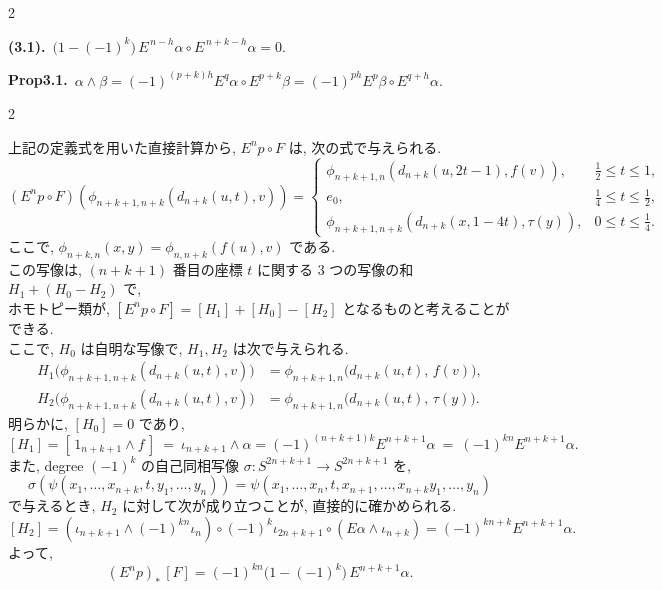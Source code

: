 \documentclass[10pt, leqno]{ltjsarticle}
\newcommand{\Ex}{E}        %
\numberwithin{equation}{section}
\theoremstyle{plain}
\theoremstyle{definition}
\theoremstyle{remark}
\begin{document}
\begin{paracol}{2}
\switchcolumn

\noindent
\textbf{(3.1).}\
\(\bigl(1-(-1)^k\bigr)\, \Ex^{\,n-h}\alpha \circ \Ex^{\,n+k-h}\alpha = 0.\)

\noindent
\textbf{Prop3.1.}\
\(
\alpha \wedge \beta
= (-1)^{(p+k)h} E^{q}\alpha \circ E^{p+k}\beta
= (-1)^{ph} E^{p}\beta \circ E^{q+h}\alpha .
\)


\end{paracol}

\begin{paracol}{2}

\noindent
上記の定義式を用いた直接計算から, 
\(E^n p\circ F\) は, 次の式で与えられる. 
\[
(E^n p\circ F)(\phi_{n+k+1, n+k}(d_{n+k}(u, t), v))=
\begin{cases}
\phi_{n+k+1, n}(d_{n+k}(u, 2t-1), f(v)), & \frac{1}{2}\le t\le1,\\[3pt]
e_0, & \frac{1}{4}\le t\le \frac{1}{2},\\[3pt]
\phi_{n+k+1, n+k}(d_{n+k}(x, 1-4t), \tau(y)), & 0\le t\le \frac{1}{4}.
\end{cases}
\]
ここで, 
\(\phi_{n+k, n}(x, y) = \phi_{n, n+k}(f(u), v)\) である. \\
この写像は, \((n+k+1)\) 番目の座標 $t$ に関する 3 つの写像の和
\(H_1 + (H_0 - H_2)\) で, \\
ホモトピー類が,
\([E^n p\circ F] = [H_1] + [H_0] - [H_2]\) 
となるものと考えることができる. \\
ここで, \(H_0\) は自明な写像で, $H_1,H_2$ は次で与えられる. 
\[
\begin{aligned}
H_1\bigl(\phi_{n+k+1,n+k}(d_{n+k}(u,t),v)\bigr)
&=\phi_{n+k+1,n}\bigl(d_{n+k}(u,t),\,f(v)\bigr),\\
H_2\bigl(\phi_{n+k+1,n+k}(d_{n+k}(u,t),v)\bigr)
&=\phi_{n+k+1,n}\bigl(d_{n+k}(u,t),\,\tau(y)\bigr).
\end{aligned}
\]
明らかに, $[H_0]=0$ であり, 
\[
[H_1] = [\,1_{n+k+1} \wedge f\,]\ 
=\ \iota_{n+k+1} \wedge \alpha
 = (-1)^{(n+k+1)k}\Ex^{n+k+1}\alpha\
=\ (-1)^{kn}E^{n+k+1}\alpha .
\]
また, degree \((-1)^k\) の自己同相写像 
\(\sigma:S^{2n+k+1}\to S^{2n+k+1}\) を, \\
\[
\sigma(\psi(x_1,\ldots,x_{n+k}, t, y_1,\ldots,y_n))
= \psi(x_1,\ldots, x_n, t, x_{n+1},\ldots,x_{n+k} y_1,\ldots,y_n)
\]
で与えるとき, $H_2$ に対して次が成り立つことが, 直接的に確かめられる.
\[
[H_2] = (\iota_{n+k+1} \wedge (-1)^{kn} \iota_n) \circ (-1)^{k}\iota_{2n+k+1}
\circ (E\alpha \wedge \iota_{n+k})
 = (-1)^{kn+k}E^{n+k+1}\alpha .
\]
よって, 
\[
(\Ex^{n}p)_*\,[F] = (-1)^{kn}\bigl(1-(-1)^k\bigr)\,\Ex^{n+k+1}\alpha .
\]
\end{paracol}
\end{document}
